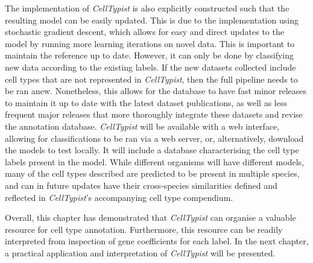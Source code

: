 The implementation of \textit{CellTypist} is also explicitly constructed such that the resulting model can be easily updated. This is due to the implementation using stochastic gradient descent, which allows for easy and direct updates to the model by running more learning iterations on novel data. This is important to maintain the reference up to date. However, it can only be done by classifying new data according to the existing labels. If the new datasets collected include cell types that are not represented in \textit{CellTypist}, then the full pipeline needs to be ran anew. Nonetheless, this allows for the database to have fast minor releases to maintain it up to date with the latest dataset publications, as well as less frequent major releases that more thoroughly integrate these datasets and revise the annotation database. \textit{CellTypist} will be available with a web interface, allowing for classifications to be ran via a web server, or, alternatively, download the models to test locally. It will include a database characterising the cell type labels present in the model. While different organisms will have different models, many of the cell types described are predicted to be present in multiple species, and can in future updates have their cross-species similarities defined and reflected in \textit{CellTypist}'s accompanying cell type compendium.

Overall, this chapter has demonstrated that \textit{CellTypist} can organise a valuable resource for cell type annotation. Furthermore, this resource can be readily interpreted from inspection of gene coefficients for each label. In the next chapter, a practical application and interpretation of \textit{CellTypist} will be presented.